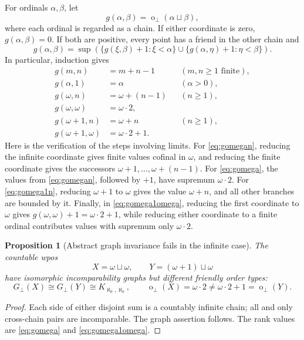 \documentclass[11pt,a4paper]{article}
\newtheorem{proposition}[theorem]{Proposition}
\theoremstyle{definition}
\theoremstyle{remark}
\newcommand{\fot}{\operatorname{o}_{\perp}}
\newcommand{\incg}{G_{\perp}}
\begin{document}
For ordinals $\alpha,\beta$, let
\[
 g(\alpha,\beta)=\fot(\alpha\sqcup\beta),
\]
where each ordinal is regarded as a chain. If either coordinate is zero,
$g(\alpha,\beta)=0$. If both are positive, every point has a friend in the
other chain and
\begin{equation}\label{eq:g}
 g(\alpha,\beta)=\sup\left(
  \{g(\xi,\beta)+1:\xi<\alpha\}
  \cup\{g(\alpha,\eta)+1:\eta<\beta\}\right).
\end{equation}
In particular, induction gives
\begin{align}
 g(m,n)&=m+n-1 &&(m,n\ge1\text{ finite}),\label{eq:gfinite}\\
 g(\alpha,1)&=\alpha &&(\alpha>0),\label{eq:gsingle}\\
 g(\omega,n)&=\omega+(n-1) &&(n\ge1),\label{eq:gomegan}\\
 g(\omega,\omega)&=\omega\cdot2,\label{eq:gomega}\\
 g(\omega+1,n)&=\omega+n &&(n\ge1),\label{eq:gomega1n}\\
 g(\omega+1,\omega)&=\omega\cdot2+1.\label{eq:gomega1omega}
\end{align}
Here is the verification of the steps involving limits. For
\eqref{eq:gomegan}, reducing the infinite coordinate gives finite values
cofinal in $\omega$, and reducing the finite coordinate gives the successors
$\omega+1,\ldots,\omega+(n-1)$. For \eqref{eq:gomega}, the values from
\eqref{eq:gomegan}, followed by $+1$, have supremum $\omega\cdot2$.
For \eqref{eq:gomega1n}, reducing $\omega+1$ to $\omega$ gives the value
$\omega+n$, and all other branches are bounded by it. Finally, in
\eqref{eq:gomega1omega}, reducing the first coordinate to $\omega$ gives
$g(\omega,\omega)+1=\omega\cdot2+1$, while reducing either coordinate to a
finite ordinal contributes values with supremum only $\omega\cdot2$.

\begin{proposition}[Abstract graph invariance fails in the infinite case]\label{prop:infinitegraph}
The countable wpos
\[
 X=\omega\sqcup\omega,\qquad Y=(\omega+1)\sqcup\omega
\]
have isomorphic incomparability graphs but different friendly order types:
\[
 \incg(X)\cong\incg(Y)\cong K_{\aleph_0,\aleph_0},\qquad
 \fot(X)=\omega\cdot2\ne\omega\cdot2+1=\fot(Y).
\]
\end{proposition}

\begin{proof}
Each side of either disjoint sum is a countably infinite chain; all and only
cross-chain pairs are incomparable. The graph assertion follows. The rank
values are \eqref{eq:gomega} and \eqref{eq:gomega1omega}.
\end{proof}
\end{document}
